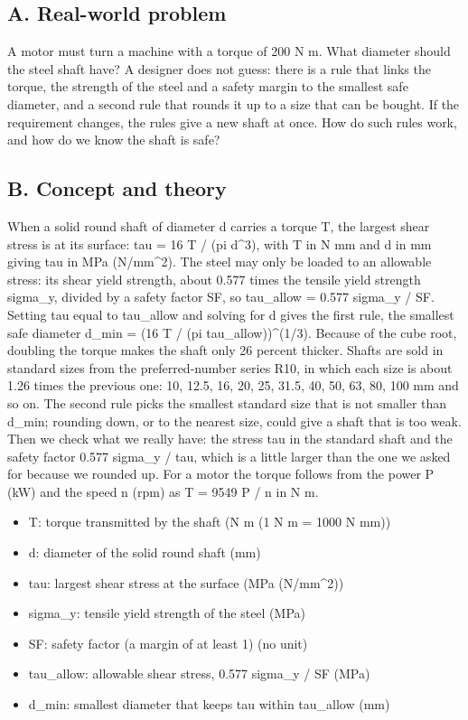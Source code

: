 \documentclass[11pt,a4paper]{article}
\begin{document}
\subsection*{A. Real-world problem}
A motor must turn a machine with a torque of 200 N m. What diameter should the steel shaft have? A designer does not guess: there is a rule that links the torque, the strength of the steel and a safety margin to the smallest safe diameter, and a second rule that rounds it up to a size that can be bought. If the requirement changes, the rules give a new shaft at once. How do such rules work, and how do we know the shaft is safe?

\subsection*{B. Concept and theory}
When a solid round shaft of diameter d carries a torque T, the largest shear stress is at its surface: tau = 16 T / (pi d\textasciicircum{}3), with T in N mm and d in mm giving tau in MPa (N/mm\textasciicircum{}2). The steel may only be loaded to an allowable stress: its shear yield strength, about 0.577 times the tensile yield strength sigma\_y, divided by a safety factor SF, so tau\_allow = 0.577 sigma\_y / SF. Setting tau equal to tau\_allow and solving for d gives the first rule, the smallest safe diameter d\_min = (16 T / (pi tau\_allow))\textasciicircum{}(1/3). Because of the cube root, doubling the torque makes the shaft only 26 percent thicker. Shafts are sold in standard sizes from the preferred-number series R10, in which each size is about 1.26 times the previous one: 10, 12.5, 16, 20, 25, 31.5, 40, 50, 63, 80, 100 mm and so on. The second rule picks the smallest standard size that is not smaller than d\_min; rounding down, or to the nearest size, could give a shaft that is too weak. Then we check what we really have: the stress tau in the standard shaft and the safety factor 0.577 sigma\_y / tau, which is a little larger than the one we asked for because we rounded up. For a motor the torque follows from the power P (kW) and the speed n (rpm) as T = 9549 P / n in N m.

\begin{itemize}[nosep]
\item T: torque transmitted by the shaft (N m (1 N m = 1000 N mm))
\item d: diameter of the solid round shaft (mm)
\item tau: largest shear stress at the surface (MPa (N/mm\textasciicircum{}2))
\item sigma\_y: tensile yield strength of the steel (MPa)
\item SF: safety factor (a margin of at least 1) (no unit)
\item tau\_allow: allowable shear stress, 0.577 sigma\_y / SF (MPa)
\item d\_min: smallest diameter that keeps tau within tau\_allow (mm)
\end{itemize}
\end{document}
